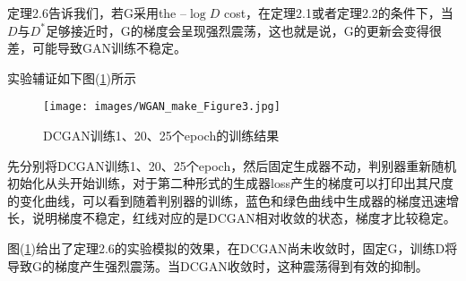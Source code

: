             \par
            定理2.6告诉我们，若G采用the –$\log D$ cost，在定理2.1或者定理2.2的条件下，当$D$与$D^*$足够接近时，G的梯度会呈现强烈震荡，这也就是说，G的更新会变得很差，可能导致GAN训练不稳定。
            \par
            实验辅证如下图(\ref{fig:WGAN前作Figure 3})所示
                \begin{figure}[H]
                \centering
                \texttt{[image: images/WGAN\_make\_Figure3.jpg]}
                \caption{DCGAN训练1、20、25个epoch的训练结果}
                \label{fig:WGAN前作Figure 3}
                \end{figure}
            先分别将DCGAN训练1、20、25个epoch，然后固定生成器不动，判别器重新随机初始化从头开始训练，对于第二种形式的生成器loss产生的梯度可以打印出其尺度的变化曲线，可以看到随着判别器的训练，蓝色和绿色曲线中生成器的梯度迅速增长，说明梯度不稳定，红线对应的是DCGAN相对收敛的状态，梯度才比较稳定。
            \par
            图(\ref{fig:WGAN前作Figure 3})给出了定理2.6的实验模拟的效果，在DCGAN尚未收敛时，固定G，训练D将导致G的梯度产生强烈震荡。当DCGAN收敛时，这种震荡得到有效的抑制。
